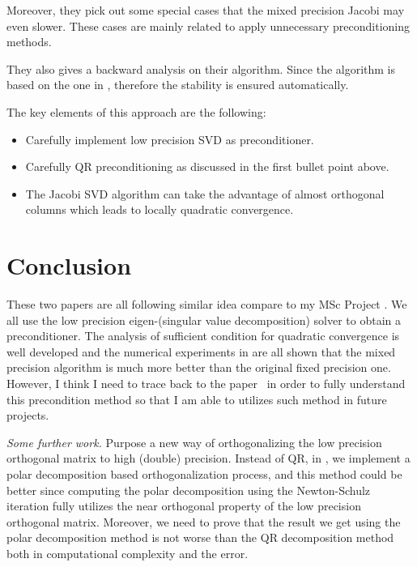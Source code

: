 \documentclass{article}
\begin{document}
Moreover, they pick out some special cases that the mixed precision
Jacobi may even slower. These cases are mainly related to apply
unnecessary preconditioning methods. 

They also gives a backward analysis on their algorithm. Since the
algorithm is based on the one in
\cite{2008DrmacVeselic_NewFastAccuratea}, therefore the stability is
ensured automatically. 

The key elements of this approach are the following:
\begin{itemize}[nosep]
    \item Carefully implement low precision SVD as preconditioner. 
    \item Carefully QR preconditioning as discussed in the first bullet
    point above. 
    \item The Jacobi SVD algorithm can take the advantage of almost
    orthogonal columns which leads to locally quadratic convergence.
\end{itemize}


\section{Conclusion}
These two papers are all following similar idea compare to my MSc
Project \cite{2022Zhou_mixedprecisioneigensolver}. We all use the low
precision eigen-(singular value decomposition) solver to obtain a
preconditioner. The analysis of sufficient condition for quadratic
convergence is well developed and the numerical experiments in
\cite{2022GaoMaShao_mixedprecisionJacobi,2022ZhangBai_mixedprecisionJacobi,2022Zhou_mixedprecisioneigensolver}
are all shown that the mixed precision algorithm is much more better
than the original fixed precision one. However, I think I need to trace
back to the
paper~\cite{2008DrmacVeselic_NewFastAccuratea,2008DrmacVeselic_NewFastAccurateb,
2017Drmac_Algorithm977QR, 1992DemmelVeselic_Jacobismethodis} in order to
fully understand this precondition method so that I am able to utilizes
such method in future projects. 

\emph{Some further work.} Purpose a new way of orthogonalizing the low
precision orthogonal matrix to high (double) precision. Instead of QR,
in \cite{2022Zhou_mixedprecisioneigensolver}, we implement a polar
decomposition based orthogonalization process, and this method could be
better since computing the polar decomposition using the Newton-Schulz
iteration fully utilizes the near orthogonal property of the low
precision orthogonal matrix. Moreover, we need to prove that the result
we get using the polar decomposition method is not worse than the QR
decomposition method both in computational complexity and the error.




\newpage 


\end{document}
